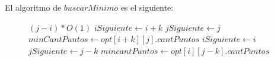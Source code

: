 El algoritmo de $buscarMinimo$ es el siguiente:

\begin{center}
 \begin{figure}[H]
  \begin{pseudo}
     \hfill $(j-i)*O(1)$
	\State $iSiguiente \leftarrow i+k$
	\State $jSiguiente \leftarrow j$
	\State $minCantPuntos \leftarrow opt[i+k][j].cantPuntos$
      \EndIf
	\State $iSiguiente \leftarrow i$
	\State $jSiguiente \leftarrow j-k$
	\State $mincantPuntos \leftarrow opt[i][j-k].cantPuntos$
      \EndIf
    \EndFor
   \EndProcedure
  \end{pseudo}

 \end{figure}

\end{center}